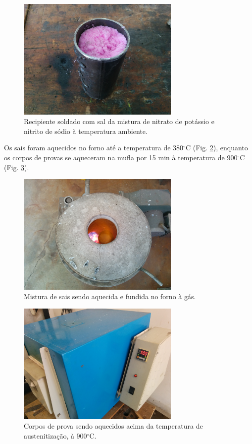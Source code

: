 \documentclass[
12pt,
openany, %
oneside, %
a4paper,			
english,			
brazil			        %
]{abntbibufjf}
\begin{document}
	\begin{figure}[H]
		\centering
		\includegraphics[width=0.7\textwidth]{sais}
		\caption{Recipiente soldado com sal da mistura de nitrato de potássio e nitrito de sódio à temperatura ambiente.}
		\label{fig:sais}
	\end{figure}

	Os sais foram aquecidos no forno até a temperatura de 380$^{\circ}$C (Fig. \ref{fig:forno}), enquanto os corpos de provas se aqueceram na mufla por 15 min à temperatura de 900$^{\circ}$C (Fig. \ref{fig:mufla}).
	
	\begin{figure}[H]
		\centering
		\includegraphics[width=0.7\textwidth]{forno}
		\caption{Mistura de sais sendo aquecida e fundida no forno à gás.}
		\label{fig:forno}
	\end{figure}

	\begin{figure}[H]
		\centering
		\includegraphics[width=0.7\textwidth]{mufla}
		\caption{Corpos de prova sendo aquecidos acima da temperatura de austenitização, à 900$^{\circ}$C.}
		\label{fig:mufla}
	\end{figure}
\end{document}
